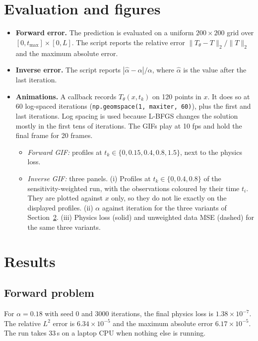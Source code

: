 \documentclass[10pt]{article}
\newcommand{\code}[1]{\texttt{#1}}
\begin{document}
\section{Evaluation and figures}
\begin{itemize}
\item \textbf{Forward error.} The prediction is evaluated on a uniform $200\times200$ grid over $[0,t_{\max}]\times[0,L]$. The script reports the relative error $\|T_\theta-T\|_2/\|T\|_2$ and the maximum absolute error.
\item \textbf{Inverse error.} The script reports $|\hat\alpha-\alpha|/\alpha$, where $\hat\alpha$ is the value after the last iteration.
\item \textbf{Animations.} A callback records $T_\theta(x,t_k)$ on 120 points in $x$. It does so at 60 log-spaced iterations (\code{np.geomspace(1, maxiter, 60)}), plus the first and last iterations. Log spacing is used because L-BFGS changes the solution mostly in the first tens of iterations. The GIFs play at 10 fps and hold the final frame for 20 frames.
\begin{itemize}
\item \emph{Forward GIF:} profiles at $t_k\in\{0,0.15,0.4,0.8,1.5\}$, next to the physics loss.
\item \emph{Inverse GIF:} three panels. (i) Profiles at $t_k\in\{0,0.4,0.8\}$ of the sensitivity-weighted run, with the observations coloured by their time $t_i$. They are plotted against $x$ only, so they do not lie exactly on the displayed profiles. (ii) $\alpha$ against iteration for the three variants of Section~\ref{sec:results}. (iii) Physics loss (solid) and unweighted data MSE (dashed) for the same three variants.
\end{itemize}
\end{itemize}

\section{Results}\label{sec:results}

\subsection{Forward problem}
For $\alpha=0.18$ with seed 0 and 3000 iterations, the final physics loss is $1.38\times10^{-7}$. The relative $L^2$ error is $6.34\times10^{-5}$ and the maximum absolute error $6.17\times10^{-5}$. The run takes 33\,s on a laptop CPU when nothing else is running.
\end{document}
